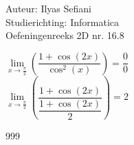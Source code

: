 \documentclass[a4paper]{article}
\begin{document}
\noindent \large Auteur: Ilyas Sefiani \\
\noindent \large Studierichting: Informatica\\
\noindent \large Oefeningenreeks 2D nr. 16.8\\

\medskip

\normalsize

$\lim\limits_{x \rightarrow \tfrac{\pi}{2}}\left(\dfrac{1+\cos(2x)}{\cos^2(x)}\right) = \dfrac{0}{0}$\\

$\lim\limits_{x \rightarrow \tfrac{\pi}{2}}\left(\dfrac{1+\cos(2x)}{\dfrac{1+\cos(2x)}{2}}\right)=2$\\

\begin{thebibliography}{999}
\end{thebibliography}
\end{document}
